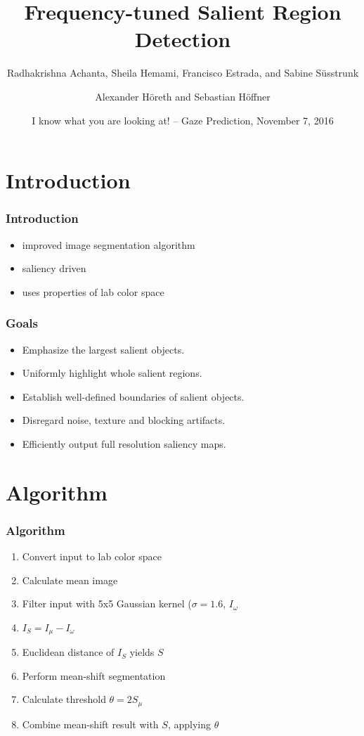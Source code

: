 \documentclass{beamer}
\title{Frequency-tuned Salient Region Detection}
\subtitle{Radhakrishna Achanta, Sheila Hemami, Francisco Estrada, and Sabine Süsstrunk}
\author{Alexander Höreth and Sebastian Höffner}
\institute{Institute of Cognitive Science\\University of Osnabrück}
\date[Nov 7, 2016]{I know what you are looking at! -- Gaze Prediction, November 7, 2016}
\begin{document}
\frame{\titlepage}


\section{Introduction}

\begin{frame}
    \frametitle{Introduction}
    \begin{itemize}
        \item improved image segmentation algorithm
        \item saliency driven
        \item uses properties of lab color space
    \end{itemize}
\end{frame}

\begin{frame}
    \frametitle{Goals}
    \begin{itemize}
        \item Emphasize the largest salient objects.
        \item Uniformly highlight whole salient regions.
        \item Establish well-defined boundaries of salient objects.
        \item Disregard noise, texture and blocking artifacts.
        \item Efficiently output full resolution saliency maps.
    \end{itemize}
\end{frame}


\section{Algorithm}

\begin{frame}
    \frametitle{Algorithm}
    \begin{enumerate}
        \item Convert input to lab color space
        \item Calculate mean image
        \item Filter input with 5x5 Gaussian kernel ($\sigma = 1.6$, $I_{\omega}$
        \item $I_S = I_{\mu} - I_{\omega}$
        \item Euclidean distance of $I_S$ yields $S$
        \item Perform mean-shift segmentation
        \item Calculate threshold $\theta = 2S_{\mu}$
        \item Combine mean-shift result with $S$, applying $\theta$
    \end{enumerate}
\end{frame}
\end{document}
